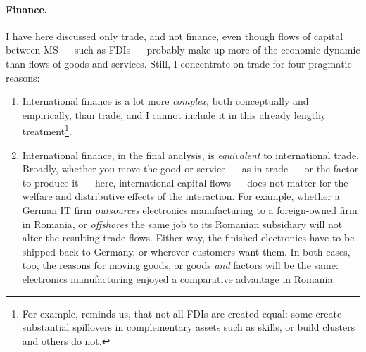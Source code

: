 \documentclass[11pt,a4paper,oneside,openright]{article}
\begin{document}
\paragraph{Finance.} I have here discussed only trade, and not finance, even though flows of capital between \gls{MS} --- such as \glspl{FDI} --- probably make up more of the economic dynamic than flows of goods and services. Still, I concentrate on trade for four pragmatic reasons:
\begin{enumerate}
	\item International finance is a lot more \emph{complex}, both conceptually and empirically, than trade, and I cannot include it in this already lengthy treatment\footnote{
		For example, \cite{Narula2005} reminds us, that not all \glspl{FDI} are created equal: some create substantial spillovers in complementary assets such as skills, or build clusters and others do not.}.
	\item International finance, in the final analysis, is \emph{equivalent} to international trade. Broadly, whether you move the good or service --- as in trade --- or the factor to produce it --- here, international capital flows --- does not matter for the welfare and distributive effects of the interaction. For example, whether a German IT firm \emph{outsources} electronics manufacturing to a foreign-owned firm in Romania, or \emph{offshores} the same job to its Romanian subsidiary will not alter the resulting trade flows. Either way, the finished electronics have to be shipped back to Germany, or wherever customers want them. In both cases, too, the reasons for moving goods, or goods \emph{and} factors will be the same: electronics manufacturing enjoyed a comparative advantage in Romania.

\end{enumerate}
\end{document}
